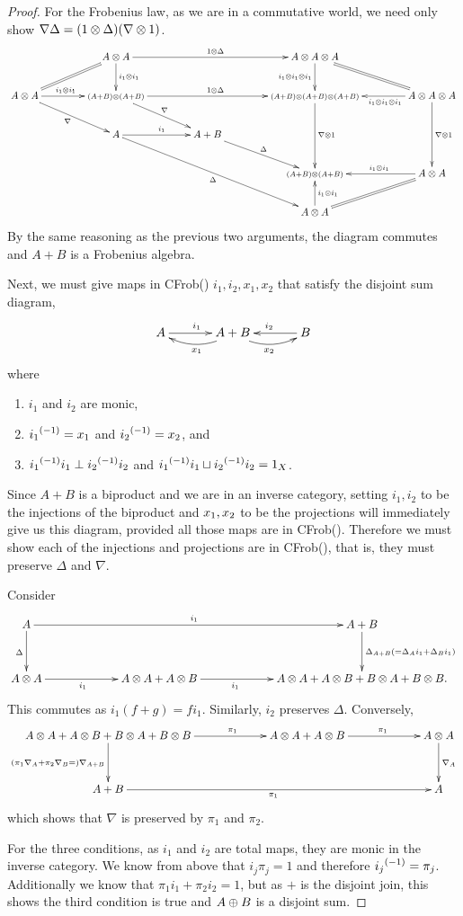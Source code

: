 \begin{proof}
  For the Frobenius law, as we are in a commutative world, we need only show
  $\nabla \Delta = (1\otimes\Delta)(\nabla\otimes1)$.
  \[
    \xymatrix@C+18pt{
      &A\*A \ar@{=}[ld] \ar[rr]^{1\*\Delta} \ar[d]^{i_1\*i_1} && A\*A\*A  \ar[d]_{i_1\*i_1\*i_1} \ar@{=}[dr] \\
      A\*A \ar[r]^(.45){i_1\*i_1}  \ar[dr]_{\nabla}
         &\scriptstyle{(A+B)\*(A+B)} \ar[rr]^{1\*\Delta} \ar[dr]^{\nabla}
         &&\scriptstyle{(A+B)\*(A+B)\*(A+B)}  \ar[dd]^{\nabla\*1} & A\*A\*A  \ar[l]^(.4){i_1\*i_1\*i_1}  \ar[dd]^{\nabla\*1}\\
     & A \ar[r]^{i_1} \ar[ddrr]_{\Delta} & A+B \ar[dr]^{\Delta} \\
     & & & \scriptstyle{(A+B)\*(A+B)} & A\*A  \ar[l]_(.45){i_1\*i_1} \ar@{=}[dl]\\
     & & & A\*A \ar[u]_{i_1\*i_1}
    }
  \]
  By the same reasoning as the previous two arguments, the diagram commutes and $A+B$ is a Frobenius
  algebra.

  Next, we must give maps in CFrob(\X) $i_1,i_2,x_1,x_2$ that satisfy the disjoint sum diagram,
  \[
    \xymatrix@C+10pt{
      A\ar[r]^{i_1} &A+B\ar@/^9pt/[l]^{x_1} \ar@/_9pt/[r]_{x_2} & B \ar[l]_{i_2}
    }
  \]
  where
  \begin{enumerate}[{(}i{)}]
    \item $i_1$ and $i_2$ are monic,
    \item ${i_1}^{(-1)} = x_1$ and ${i_2}^{(-1)} = x_2$, and
    \item ${i_1}^{(-1)}i_1 \perp {i_2}^{(-1)}i_2$ and ${i_1}^{(-1)}i_1 \sqcup {i_2}^{(-1)}i_2 = 1_X$.
  \end{enumerate}

  Since $A+B$ is a biproduct and we are in an inverse category, setting $i_1,i_2$ to be the
  injections of the biproduct and $x_1,x_2$ to be the projections will immediately give us this
  diagram, provided all those maps are in CFrob(\X). Therefore we must show each of the injections
  and projections are in CFrob(\X), that is, they must preserve $\Delta$ and $\nabla$.

  Consider
  \[
     \xymatrix@C+40pt@R+10pt{
       A \ar[d]_{\Delta} \ar[rr]^{i_1} & &A+B \ar[d]^{\Delta_{A+B}(=\Delta_A i_1 + \Delta_B i_1)}\\
       A\*A \ar[r]_(.425){i_1} &A\*A+A\*B \ar[r]_(.375){i_1} & A\*A+A\*B+B\*A+B\*B.
     }
  \]
  This commutes as $i_1(f+g) = fi_1$. Similarly, $i_2$ preserves $\Delta$.
  Conversely,
  \[
    \xymatrix@C+40pt@R+10pt{
       {A\*A+A\*B+B\*A+B\*B}  \ar[d]_{(\pi_1\nabla_A + \pi_2\nabla_B=)\nabla_{A+B}} \ar[r]^(.625){\pi_1}
         &A\*A+A\*B \ar[r]^(.575){\pi_1} &A\*A\ar[d]^{\nabla_A}\\
       A+B \ar[rr]_{\pi_1}& & A
    }
  \]
  which shows that $\nabla$ is preserved by $\pi_1$ and $\pi_2$.

  For the three conditions, as $i_1$ and $i_2$ are total maps, they are monic in the inverse
  category. We know from above that $i_j\pi_j = 1$ and therefore ${i_j}^{(-1)} = \pi_j$. Additionally
  we know that $\pi_1i_1 + \pi_2i_2 = 1$, but as $+$ is the disjoint join, this shows the third
  condition is true and $A\oplus B$ is a disjoint sum.
\end{proof}


